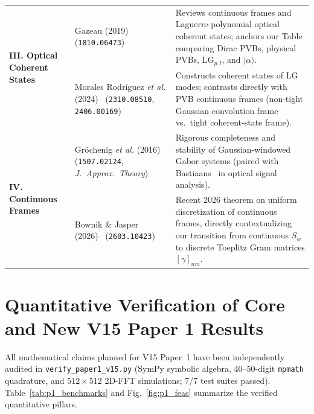 \documentclass[10pt,letterpaper]{article}
\newcommand{\ket}[1]{\lvert #1 \rangle}
\begin{document}
\begin{table}[t]
\begin{tabularx}{\linewidth}{@{}l>{\raggedright\arraybackslash}p{4.6cm}>{\raggedright\arraybackslash}X@{}}
\midrule
\multirow{2}{*}{\textbf{III. Optical Coherent States}}
  & Gazeau (2019)~\cite{Gazeau2018} (\texttt{1810.06473}) & Reviews continuous frames and Laguerre-polynomial optical coherent states; anchors our Table comparing Dirac PVBs, physical PVBs, $\mathrm{LG}_{p,l}$, and $\ket{\alpha}$. \\
  & Morales Rodr\'iguez \emph{et al.} (2024)~\cite{MoralesRodriguez2024OL,MoralesRodriguez2024PRA} (\texttt{2310.08510}, \texttt{2406.00169}) & Constructs coherent states of LG modes; contrasts directly with PVB continuous frames (non-tight Gaussian convolution frame vs.\ tight coherent-state frame). \\
\midrule
\multirow{2}{*}{\textbf{IV. Continuous Frames}}
  & Gr\"ochenig \emph{et al.} (2016)~\cite{Grochenig2016} (\texttt{1507.02124}, \emph{J.\ Approx.\ Theory}) & Rigorous completeness and stability of Gaussian-windowed Gabor systems (paired with Bastiaans~\cite{Bastiaans1980} in optical signal analysis). \\
  & Bownik \& Jasper (2026)~\cite{Bownik2026} (\texttt{2603.10423}) & Recent 2026 theorem on uniform discretization of continuous frames, directly contextualizing our transition from continuous $S_w$ to discrete Toeplitz Gram matrices $[\gamma]_{nm}$. \\
\bottomrule
\end{tabularx}
\end{table}

\section{Quantitative Verification of Core and New V15 Paper 1 Results}
\label{sec:verification}

All mathematical claims planned for V15 Paper~1 have been independently audited in \texttt{verify\_paper1\_v15.py} (SymPy symbolic algebra, 40--50-digit \texttt{mpmath} quadrature, and $512\times 512$ 2D-FFT simulations; 7/7 test suites passed). Table~\ref{tab:p1_benchmarks} and Fig.~\ref{fig:p1_feas} summarize the verified quantitative pillars.
\end{document}
